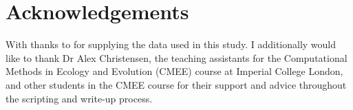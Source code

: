 \documentclass[11pt]{article}
\begin{document}
	\section{Acknowledgements}
	
	With thanks to \cite{bae2014growth, bernhardt2018metabolic, galarz2016predicting, gill1991growth, phillips1987relation, roth1962continuity, silva2018modelling, sivonen1990effects, stannard1985temperature, zwietering1994modeling} for supplying the data used in this study. I additionally would like to thank Dr Alex Christensen, the teaching assistants for the Computational Methods in Ecology and Evolution (CMEE) course at Imperial College London, and other students in the CMEE course for their support and advice throughout the scripting and write-up process.
	
	
	
\end{document}
